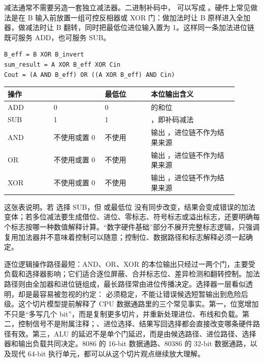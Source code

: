 减法通常不需要另造一套独立减法器。二进制补码中， 可以写成 。硬件上常见做法是在 B 输入前放置一组可控反相器或 XOR 门：做加法时让 B 原样进入全加器，做减法时让 B 翻转，同时把最低位进位输入置为 1。这样同一条加法进位链既可服务 ADD，也可服务 SUB。

\begin{lstlisting}
B_eff = B XOR B_invert
sum_result = A XOR B_eff XOR Cin
Cout = (A AND B_eff) OR ((A XOR B_eff) AND Cin)
\end{lstlisting}

\begin{longtable}{L{0.18\linewidth}L{0.2\linewidth}L{0.18\linewidth}L{0.34\linewidth}}
\toprule
操作 &  & 最低位  & 本位输出含义 \\
\midrule
ADD & 0 & 0 &  的和位 \\\tablerowrule
SUB & 1 & 1 & ，即补码减法 \\\tablerowrule
AND & 不使用或置 0 & 不使用 & 输出 ，进位链不作为结果来源 \\\tablerowrule
OR & 不使用或置 0 & 不使用 & 输出 ，进位链不作为结果来源 \\\tablerowrule
XOR & 不使用或置 0 & 不使用 & 输出 ，进位链不作为结果来源 \\
\bottomrule
\end{longtable}

这张表说明。若  选择 SUB，但  或最低位  没有同步改变，结果会变成错误的加法变体；若多位减法要生成借位、进位、零标志、符号标志或溢出标志，还要明确每个标志按哪一种数值解释计算。“数字硬件基础”部分不展开完整标志逻辑，只强调复用加法器并不意味着控制可以随意；控制位、数据路径和标志解释必须一起确定。

逐位逻辑操作路径最短：AND、OR、XOR 的本位输出只经过一两个门，主要受负载和选择器影响；它们适合逐位屏蔽、合并标志位、差异检测和翻转控制。加法路径则由全加器和进位链组成，最长路径常由进位传播决定。选择器一层看似透明，却是最容易被忽视的约定： 必须稳定，不能让错误候选短暂输出到危险后级。这个切片模型提前解释了 CPU 数据通路里的三个常见事实。第一，位宽增加不只是“多写几个 bit”，而是复制更多切片，并重新处理进位、布线和负载。第二，控制信号不是附属注释；、进位选择、结果写回选择都会直接改变哪条硬件路径有效。第三，ALU 的延迟不是单个门延迟，而是由候选路径、进位路径、选择器和输出负载共同决定。8086 的 16-bit 数据通路、80386 的 32-bit 数据通路，以及现代 64-bit 执行单元，都可以从这个切片观点继续放大理解。

